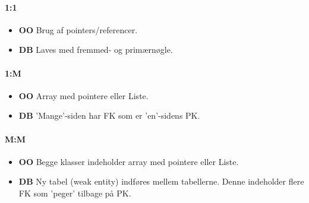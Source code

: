 \paragraph{1:1}

\begin{itemize}
	\item \textbf{OO}
	Brug af pointers/referencer.
	\item \textbf{DB}
	Laves med fremmed- og primærnøgle.
\end{itemize}

\paragraph{1:M}

\begin{itemize}
	\item \textbf{OO}
	Array med pointere eller Liste.
	\item \textbf{DB}
	'Mange'-siden har FK som er 'en'-sidens PK.
\end{itemize}

\paragraph{M:M}

\begin{itemize}
	\item \textbf{OO}
	Begge klasser indeholder array med pointere eller Liste.
	\item \textbf{DB}
	Ny tabel (weak entity) indføres mellem tabellerne. Denne indeholder flere FK som 'peger' tilbage på PK.
\end{itemize}

%
%
%
%
%
